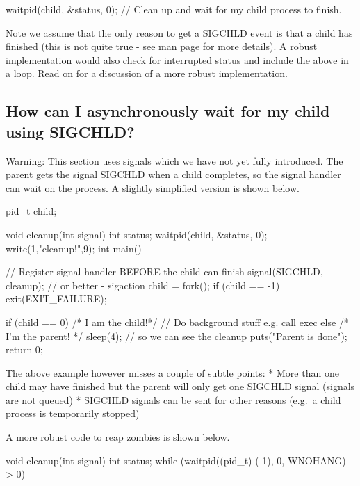 \begin{code}[language=C]
waitpid(child, &status, 0); // Clean up and wait for my child process to finish.
\end{code}

Note we assume that the only reason to get a SIGCHLD event is that a child has finished (this is not quite true - see man page for more details). A robust implementation would also check for interrupted status and include the above in a loop. Read on for a discussion of a more robust implementation.

\begin{aside}

\subsection{How can I asynchronously wait for my child using SIGCHLD?}

Warning: This section uses signals which we have not yet fully introduced. The parent gets the signal SIGCHLD when a child completes, so the signal handler can wait on the process. A slightly simplified version is shown below.

\begin{code}[language=C]
pid_t child;

void cleanup(int signal) {
  int status;
  waitpid(child, &status, 0);
  write(1,"cleanup!\n",9);
}
int main() {
   // Register signal handler BEFORE the child can finish
   signal(SIGCHLD, cleanup); // or better - sigaction
   child = fork();
   if (child == -1) { exit(EXIT_FAILURE);}

   if (child == 0) { /* I am the child!*/
     // Do background stuff e.g. call exec   
   } else { /* I'm the parent! */
      sleep(4); // so we can see the cleanup
      puts("Parent is done");
   }
   return 0;
} 
\end{code}

The above example however misses a couple of subtle points: * More than one child may have finished but the parent will only get one SIGCHLD signal (signals are not queued) * SIGCHLD signals can be sent for other reasons (e.g.~a child process is temporarily stopped)

A more robust code to reap zombies is shown below.

\begin{code}[language=C]
void cleanup(int signal) {
  int status;
  while (waitpid((pid_t) (-1), 0, WNOHANG) > 0) {}
}
\end{code}
\end{aside}

